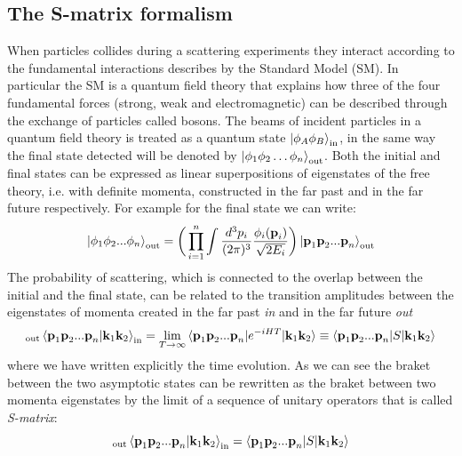 \documentclass[../main/main.tex]{subfiles}
\begin{document}
\subsection{The S-matrix formalism}
When particles collides during a scattering experiments they interact according to the fundamental
interactions describes by the Standard Model (SM).
In particular the SM is a quantum field theory that explains how three of the four fundamental forces (strong, weak and electromagnetic) can be described through the exchange of particles called bosons.
\newline
The beams of incident particles in a quantum field theory is treated as a quantum state $\ket{\phi_A\phi_B}_{\text{in}}$, in the same way the final state detected will be denoted by $\ket{\phi_1 \phi_2 \dots \phi_n}_{\text{out}}$. 
Both the initial and final states can be expressed as linear superpositions of eigenstates of the free theory, i.e. with definite momenta, constructed in the far past and in the far future respectively.
For example for the final state we can write:
\begin{equation}
	\ket{\phi_1 \phi_2 ...\phi_n}_\text{out} =\bigg( \prod_{i=1}^{n}\int
	 \frac{d^3 p_i}{(2 \pi)^3}
	\frac{\phi_i(\textbf{p}_i)}{\sqrt{2 E_i}} \bigg) \ket{\textbf{p}_1\textbf{p}_2...\textbf{p}_n}_\text{out}
\end{equation}
The probability  of scattering, which is connected to the overlap between the initial and the final state, can be related to the transition amplitudes between the eigenstates of momenta created in the far past \emph{in} and in the far future \emph{out}
\begin{equation}
	{}_\text{out}\braket{\textbf{p}_1\textbf{p}_2 ... \textbf{p}_n | \textbf{k}_1 \textbf{k}_2 }_\text{in} = \lim_{T \to \infty} \braket{\textbf{p}_1\textbf{p}_2 ... \textbf{p}_n |e^{- i H T} |\textbf{k}_1 \textbf{k}_2 } \equiv \braket{\textbf{p}_1\textbf{p}_2 ... \textbf{p}_n |S |\textbf{k}_1 \textbf{k}_2 } 
\end{equation} 
where we have written explicitly the time evolution. As we can see the braket between the two asymptotic states can be rewritten as the braket between two momenta eigenstates by the limit of a sequence of unitary operators that is called \emph{S-matrix}:
\begin{equation}
	{}_\text{out}\braket{\textbf{p}_1\textbf{p}_2 ... \textbf{p}_n | \textbf{k}_1 \textbf{k}_2 }_\text{in} =  \braket{\textbf{p}_1\textbf{p}_2 ... \textbf{p}_n |S |\textbf{k}_1 \textbf{k}_2 } 
\end{equation} 
\end{document}
